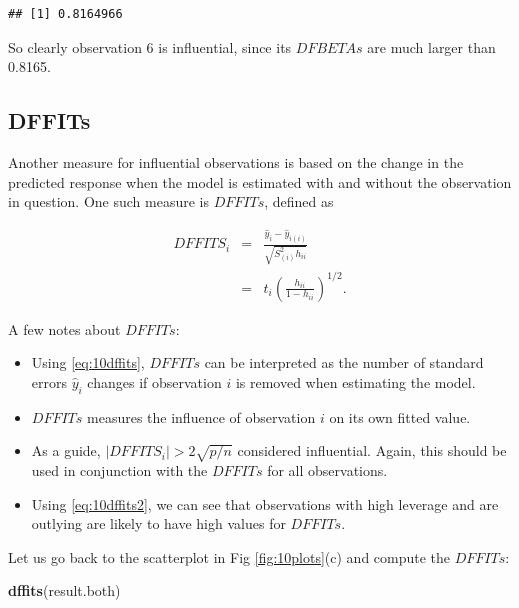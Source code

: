 \documentclass[
]{book}
\newenvironment{Shaded}{\begin{snugshade}}{\end{snugshade}}
\newcommand{\FunctionTok}[1]{\textcolor[rgb]{0.13,0.29,0.53}{\textbf{#1}}}
\newcommand{\NormalTok}[1]{#1}
\providecommand{\tightlist}{%
  \setlength{\itemsep}{0pt}\setlength{\parskip}{0pt}}
\begin{document}
\begin{verbatim}
## [1] 0.8164966
\end{verbatim}

So clearly observation 6 is influential, since its \(DFBETAs\) are much larger than 0.8165.

\hypertarget{dffits}{%
\subsection{DFFITs}\label{dffits}}

Another measure for influential observations is based on the change in the predicted response when the model is estimated with and without the observation in question. One such measure is \(DFFITs\), defined as

\begin{eqnarray}
DFFITS_i &=& \frac{\hat{y}_i-\hat{y}_{i(i)}}{\sqrt{S^2_{(i)}h_{ii}}} \label{eq:10dffits} \\
                 &=& t_i\left(\frac{h_{ii}}{1-h_{ii}}\right)^{1/2}. \label{eq:10dffits2}
\end{eqnarray}

A few notes about \(DFFITs\):

\begin{itemize}
\tightlist
\item
  Using \eqref{eq:10dffits}, \(DFFITs\) can be interpreted as the number of standard errors \(\hat{y}_i\) changes if observation \(i\) is removed when estimating the model.
\item
  \(DFFITs\) measures the influence of observation \(i\) on its own fitted value.
\item
  As a guide, \(\left|DFFITS_i\right| > 2\sqrt{p/n}\) considered influential. Again, this should be used in conjunction with the \(DFFITs\) for all observations.
\item
  Using \eqref{eq:10dffits2}, we can see that observations with high leverage and are outlying are likely to have high values for \(DFFITs\).
\end{itemize}

Let us go back to the scatterplot in Fig \ref{fig:10plots}(c) and compute the \(DFFITs\):

\begin{Shaded}
\begin{Highlighting}[]
\FunctionTok{dffits}\NormalTok{(result.both)}
\end{Highlighting}
\end{Shaded}
\end{document}

